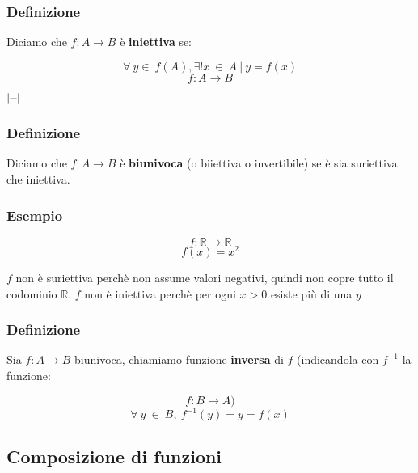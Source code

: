    \subsubsection*{Definizione}
        Diciamo che $f:A\rightarrow B$ è \textbf{iniettiva} se:
        \begin{large}
            \[
                \forall\ y \in\ f(A), \exists! x\ \in\ A\ |\ y = f(x)    
            \]
            \[
                f:A \rightarrow B    
            \]
        \end{large}
        \vspace{-7ex}
        \begin{center}
            \begin{small}
                \hspace{0.5cm}$|\text{\hspace{-0.1cm}}-\text{\hspace{-0.1cm}}|$
            \end{small}
        \end{center}
    \subsubsection*{Definizione}
        Diciamo che $f:A\rightarrow B$ è \textbf{biunivoca} (o biiettiva o invertibile) se è sia suriettiva che iniettiva.

    \subsubsection*{Esempio}
        \[f: \mathbb{R} \rightarrow \mathbb{R}\]
        \[f(x) = x^{2}\]

        $f$ non è suriettiva perchè non assume valori negativi, quindi non copre tutto il codominio $\mathbb{R}$.
        $f$ non è iniettiva perchè per ogni $x > 0$ esiste più di una $y$

    \subsubsection*{Definizione}
        Sia $f: A\rightarrow B$ biunivoca, chiamiamo funzione \textbf{inversa} di $f$ (indicandola con $f^{-1}$ la funzione:
        \begin{Large}
            \[
                f:B \rightarrow A)
            \]
            \[
                \forall\ y\ \in\ B,\ f^{-1}(y) = y = f(x)    
            \]
        \end{Large}
\subsection{Composizione di funzioni}
